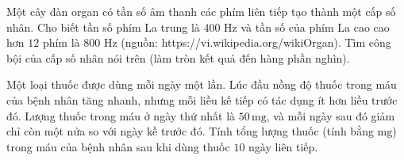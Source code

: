 \begin{bt}%
	Một cây đàn organ có tần số âm thanh các phím liên tiếp tạo thành một cấp số nhân. Cho biết tần số phím La trung là $400$ Hz và tần số của phím La cao cao hơn $12$ phím là $800$ Hz (nguồn: https://vi.wikipedia.org/wikiOrgan). Tìm công bội của cấp số nhân nói trên (làm tròn kết quả đến hàng phần nghìn).
\end{bt}


\begin{bt}%
	Một loại thuốc được dùng mỗi ngày một lần. Lúc đầu nồng độ thuốc trong máu của bệnh nhân tăng nhanh, nhưng mỗi liều kế tiếp có tác dụng ít hơn liều trước đó. Lượng thuốc trong máu ở ngày thứ nhất là $50 \,\mathrm{mg}$, và mỗi ngày sau đó giảm chỉ còn một nửa so với ngày kề trước đó. Tính tổng lượng thuốc (tính bằng $\mathrm{mg}$) trong máu của bệnh nhân sau khi dùng thuốc $10$ ngày liên tiếp.
\end{bt}
